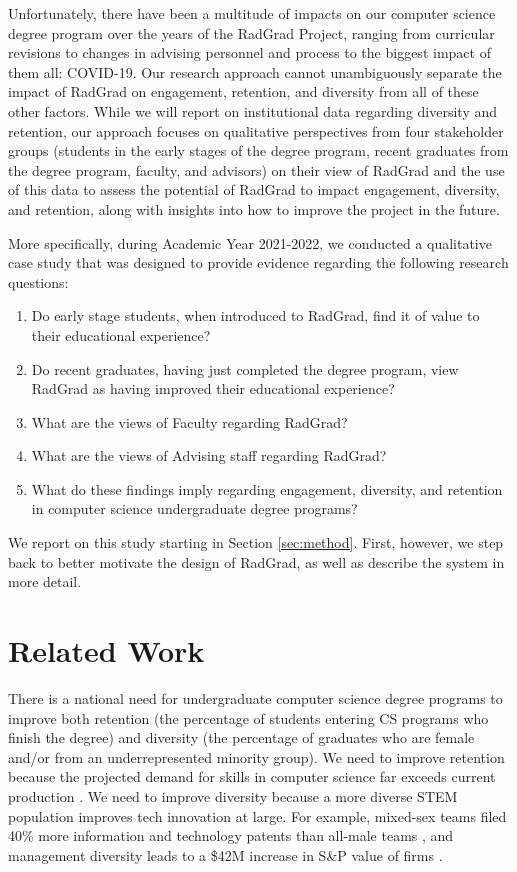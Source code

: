 \documentclass[acmsmall,nonacm]{acmart}
\begin{document}
Unfortunately, there have been a multitude of impacts on our computer science degree program over the years of the RadGrad Project, ranging from curricular revisions to changes in advising personnel and process to the biggest impact of them all: COVID-19.  Our research approach cannot unambiguously separate the impact of RadGrad on engagement, retention, and diversity from all of these other factors.  While we will report on institutional data regarding diversity and retention, our approach focuses on qualitative perspectives from four stakeholder groups (students in the early stages of the degree program, recent graduates from the degree program, faculty, and advisors) on their view of RadGrad and the use of this data to assess the potential of RadGrad to impact engagement, diversity, and retention, along with insights into how to improve the project in the future.

More specifically, during Academic Year 2021-2022, we conducted a qualitative case study that was designed to provide evidence regarding the following research questions:

\begin{enumerate}
\item Do early stage students, when introduced to RadGrad, find it of value to their educational experience?
\item Do recent graduates, having just completed the degree program, view RadGrad as having improved their educational experience?
\item What are the views of Faculty regarding RadGrad?
\item What are the views of Advising staff regarding RadGrad?
\item What do these findings imply regarding engagement, diversity, and retention in computer science undergraduate degree programs?
\end{enumerate}

We report on this study starting in Section \ref{sec:method}. First, however, we step back to better motivate the design of RadGrad, as well as describe the system in more detail.

\section{Related Work}
\label{sec:related-work}

There is a national need for undergraduate computer science degree programs to improve both retention (the percentage of students entering CS programs who finish the degree) and diversity (the percentage of graduates who are female and/or from an underrepresented minority group).  We need to improve retention because the projected demand for skills in computer science far exceeds current production \cite{camp_generation_2017}.  We need to improve diversity because a more diverse STEM population improves tech innovation at large. For example, mixed-sex teams filed 40\% more information and technology patents than all-male teams \cite{ashcraft_who_2012}, and management diversity leads to a \$42M increase in S\&P value of firms \cite{dezso_girl_2007}.
\end{document}
